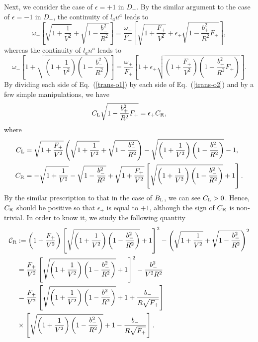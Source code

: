 \documentclass[aps,preprint,preprintnumber,nofootinbib,amsmath,amssymb,ascmac,bm,12pt]{revtex4}
\newcommand{\omp}{\omega_+}
\newcommand{\omm}{\omega_-}
\newcommand{\bpu}{b_+}
\newcommand{\bmi}{b_-}
\begin{document}
Next, we consider the case of $\epsilon=+1$ in $D_-$. 
By the similar argument to the case of $\epsilon=-1$ in $D_-$, 
the continuity of $l_a u^a$ leads to
\begin{equation}
\omm\left[\sqrt{1+\frac{1}{V^2}}+\sqrt{1-\dfrac{\bmi^2}{R^2}}\right]
=\frac{\omp}{F_+}\left[\sqrt{1+\dfrac{F_+}{V^2}}
+\epsilon_+\sqrt{1-\frac{\bpu^2}{R^2}F_+}\right], \label{trans-o1}
\end{equation}
whereas the continuity of $l_an^a$ leads to
\begin{equation}
\omm \left[1+\sqrt{\left(1+\frac{1}{V^2}\right)\left(1-\dfrac{\bmi^2}{R^2}\right)}\right]
=\frac{\omp}{F_+}\left[1+\epsilon_+\sqrt{\left(1+\dfrac{F_+}{V^2}\right)
\left(1-\frac{\bpu^2}{R^2}F_+\right)}\right].  \label{trans-o2}
\end{equation}
By dividing each side of Eq.~(\ref{trans-o1}) by each side of Eq.~(\ref{trans-o2}) and by 
a few simple manipulations, we have
\begin{equation}
C_{\rm L}\sqrt{1-\frac{\bpu^2}{R^2}F_+}=\epsilon_+C_{\rm R}, \label{trans-o3}
\end{equation}
where
\begin{align}
C_{\rm L}&=\sqrt{1+\frac{F_+}{V^2}}
\left(\sqrt{1+\frac{1}{V^2}}+\sqrt{1-\frac{\bmi^2}{R^2}}\right)
-\sqrt{\left(1+\frac{1}{V^2}\right)\left(1-\frac{\bmi^2}{R^2}\right)}-1, \\
C_{\rm R}&=-\sqrt{1+\frac{1}{V^2}}-\sqrt{1-\frac{\bmi^2}{R^2}}
+\sqrt{1+\frac{F_+}{V^2}}
\left[\sqrt{\left(1+\frac{1}{V^2}\right)\left(1-\frac{\bmi^2}{R^2}\right)}+1\right]. \label{CR}
\end{align}
By the similar prescription to that in the case of $B_{\rm L}$, we can see $C_{\rm L}>0$.  
Hence, $C_{\rm R}$ should be positive so that $\epsilon_+$ is equal to $+1$,  
although the sign of $C_{\rm R}$ is non-trivial. In order to know it, we study the 
following quantity
\begin{align}
{\cal C}_{\rm R}&:=
\left(1+\frac{F_+}{V^2}\right)
\left[\sqrt{\left(1+\frac{1}{V^2}\right)\left(1-\frac{\bmi^2}{R^2}\right)}+1\right]^2
-\left(\sqrt{1+\frac{1}{V^2}}+\sqrt{1-\frac{\bmi^2}{R^2}}\right)^2 \nonumber \\
&=\frac{F_+}{V^2}
\left[\sqrt{\left(1+\frac{1}{V^2}\right)\left(1-\frac{\bmi^2}{R^2}\right)}+1\right]^2
-\frac{\bmi^2}{V^2R^2} \nonumber \\
&=\frac{F_+}{V^2}\left[\sqrt{\left(1+\frac{1}{V^2}\right)\left(1-\frac{\bmi^2}{R^2}\right)}+1
+\frac{\bmi}{R\sqrt{F_+}}\right] \nonumber \\
&\times\left[\sqrt{\left(1+\frac{1}{V^2}\right)\left(1-\frac{\bmi^2}{R^2}\right)}+1
-\frac{\bmi}{R\sqrt{F_+}}\right].
\end{align}
\end{document}
